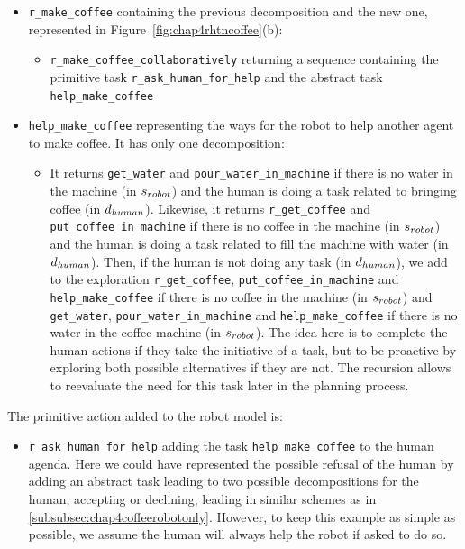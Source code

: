 \documentclass[a4paper,11pt,twoside]{StyleThese}
\begin{document}
\begin{itemize}
\item \verb'r_make_coffee' containing the previous decomposition and the new one, represented in Figure~\ref{fig:chap4rhtncoffee}(b):
	\begin{itemize}
	\item \verb'r_make_coffee_collaboratively' returning a sequence containing the primitive task \verb'r_ask_human_for_help' and the abstract task \verb'help_make_coffee'
	\end{itemize}
\item \verb'help_make_coffee' representing the ways for the robot to help another agent to make coffee. It has only one decomposition:
	\begin{itemize}
	\item It returns \verb'get_water' and \verb'pour_water_in_machine' if there is no water in the machine (in $s_{robot}$) and the human is doing a task related to bringing coffee (in $d_{human}$). Likewise, it returns \verb'r_get_coffee' and \verb'put_coffee_in_machine' if there is no coffee in the machine (in $s_{robot}$) and the human is doing a task related to fill the machine with water (in $d_{human}$). Then, if the human is not doing any task (in $d_{human}$), we add to the exploration \verb'r_get_coffee', \verb'put_coffee_in_machine' and \verb'help_make_coffee' if there is no coffee in the machine (in $s_{robot}$) and \verb'get_water', \verb'pour_water_in_machine' and \verb'help_make_coffee' if there is no water in the coffee machine (in $s_{robot}$). The idea here is to complete the human actions if they take the initiative of a task, but to be proactive by exploring both possible alternatives if they are not. The recursion allows to reevaluate the need for this task later in the planning process.
	\end{itemize}
\end{itemize}

The primitive action added to the robot model is:
\begin{itemize}
\item \verb'r_ask_human_for_help' adding the task \verb'help_make_coffee' to the human agenda. Here we could have represented the possible refusal of the human by adding an abstract task leading to two possible decompositions for the human, accepting or declining, leading in similar schemes as in \ref{subsubsec:chap4coffeerobotonly}. However, to keep this example as simple as possible, we assume the human will always help the robot if asked to do so.
\end{itemize}
\end{document}
